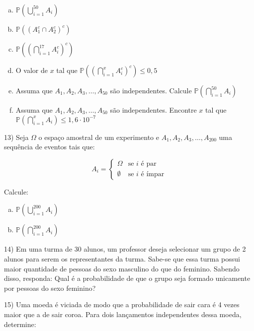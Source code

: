 \documentclass{article}
\begin{document}
\begin{enumerate}[a)]
    \item $\mathds{P}\left(\displaystyle\bigcup_{i=1}^{50} A_i\right)$
    \item $\mathds{P}\left(\left( A_1^c \cap A_2^c \right)^c\right)$
    \item $\mathds{P}\left(\left(\displaystyle\bigcap_{i=1}^{17} A_i^c\right)^c\right)$
    \item O valor de $x$ tal que  $\mathds{P}\left(\left(\displaystyle\bigcap_{i=1}^x A_i^c\right)^c\right) \leq 0,5$
    \item Assuma que $A_1, A_2, A_3, \dots, A_{50}$ são independentes. Calcule $\mathds{P}\left( \displaystyle\bigcap_{i=1}^{50} A_i\right)$
    \item Assuma que $A_1, A_2, A_3, \dots, A_{50}$ são independentes. Encontre $x$ tal que  $\mathds{P}\left( \displaystyle\bigcap_{i=1}^{x} A_i\right) \leq 1,6 \cdot 10^{-7}$
\end{enumerate}

\vspace{5px}

13) Seja $\Omega$ o espaço amostral de um experimento e $A_1, A_2, A_3, \dots, A_{200}$ uma sequência de eventos tais que:

$$A_i = \begin{cases}
\Omega & \text{se $i$ é par} \\
\emptyset & \text{se $i$ é ímpar} 
\end{cases}$$

Calcule:

\begin{enumerate}[a)]
   \item $\mathds{P}\left(\displaystyle\bigcup_{i=1}^{200} A_i\right)$
   \item $\mathds{P}\left(\displaystyle\bigcap_{i=1}^{200} A_i\right)$
\end{enumerate}

\vspace{5px}

14) Em uma turma de 30 alunos, um professor deseja selecionar um grupo de 2 alunos para serem os representantes da turma.
Sabe-se que essa turma possui maior quantidade de pessoas do sexo masculino do que do feminino.
Sabendo disso, responda: Qual é a probabilidade de que o grupo seja formado unicamente por pessoas do sexo feminino?

\vspace{5px}

15) Uma moeda é viciada de modo que a probabilidade de sair cara é 4 vezes maior que a de sair coroa.
 Para dois lançamentos independentes dessa moeda, determine:
\end{document}
